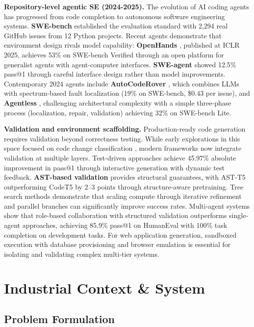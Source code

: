 \documentclass[conference]{IEEEtran}
\begin{document}
\textbf{Repository-level agentic SE (2024-2025).} The evolution of AI coding agents has progressed from code completion to autonomous software engineering systems. \textbf{SWE-bench} \cite{jimenez2024swe} established the evaluation standard with 2,294 real GitHub issues from 12 Python projects. Recent agents demonstrate that environment design rivals model capability: \textbf{OpenHands} \cite{wang2024openhands}, published at ICLR 2025, achieves 53\% on SWE-bench Verified through an open platform for generalist agents with agent-computer interfaces. \textbf{SWE-agent} \cite{yang2024swe} showed 12.5\% pass@1 through careful interface design rather than model improvements. Contemporary 2024 agents include \textbf{AutoCodeRover} \cite{zhang2024autocoder}, which combines LLMs with spectrum-based fault localization (19\% on SWE-bench, \$0.43 per issue), and \textbf{Agentless} \cite{xia2024agentless}, challenging architectural complexity with a simple three-phase process (localization, repair, validation) achieving 32\% on SWE-bench Lite.

\textbf{Validation and environment scaffolding.} Production-ready code generation requires validation beyond correctness testing. While early explorations in this space focused on code change classification \cite{kniazev2008automated}, modern frameworks now integrate validation at multiple layers. Test-driven approaches \cite{pan2024ticoder} achieve 45.97\% absolute improvement in pass@1 through interactive generation with dynamic test feedback. \textbf{AST-based validation} \cite{gong2024astt5} provides structural guarantees, with AST-T5 outperforming CodeT5 by 2--3 points through structure-aware pretraining. Tree search methods \cite{li2025s} demonstrate that scaling compute through iterative refinement and parallel branches can significantly improve success rates. Multi-agent systems \cite{hong2023metagpt} show that role-based collaboration with structured validation outperforms single-agent approaches, achieving 85.9\% pass@1 on HumanEval with 100\% task completion on development tasks. For web application generation, sandboxed execution with database provisioning and browser emulation is essential for isolating and validating complex multi-tier systems.

\section{Industrial Context \& System}
\label{sec:method}

\subsection{Problem Formulation}
\end{document}
